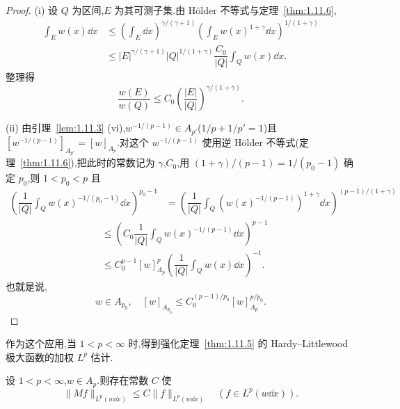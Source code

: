 \begin{proof}
(i) 设 $Q$ 为区间,$E$ 为其可测子集.由 Hölder 不等式与定理~\ref{thm:1.11.6},
\begin{align*}
\displaystyle\int_{E}w(x)\dd x &\leq \left(\int_{E}\dd x\right)^{\gamma/(\gamma+1)}\left(\int_{E}w(x)^{1+\gamma}\dd x\right)^{1/(1+\gamma)} \\
&\leq |E|^{\gamma/(\gamma+1)}|Q|^{1/(1+\gamma)}\dfrac{C_{0}}{|Q|}\int_{Q}w(x)\dd x.
\end{align*}
整理得
\begin{equation*}
\frac{w(E)}{w(Q)} \leq C_{0}\left(\frac{|E|}{|Q|}\right)^{\gamma/(1+\gamma)}.
\end{equation*}

(ii) 由引理~\ref{lem:1.11.3} (vi),$w^{-1/(p-1)} \in A_{p'}$($1/p + 1/p' = 1$)且 $[w^{-1/(p-1)}]_{A_{p'}} = [w]_{A_{p}}$.对这个 $w^{-1/(p-1)}$ 使用逆 Hölder 不等式(定理~\ref{thm:1.11.6}),把此时的常数记为 $\gamma$,$C_{0}$,用 $(1 + \gamma)/(p - 1) = 1/(p_{0} - 1)$ 确定 $p_{0}$,则 $1 < p_{0} < p$ 且
\begin{equation*}
\begin{aligned}
\left(\dfrac{1}{|Q|}\displaystyle\int_{Q}w(x)^{-1/(p_{0}-1)}\dd x\right)^{p_{0}-1}&= \left(\dfrac{1}{|Q|}\displaystyle\int_{Q}\left(w(x)^{-1/(p-1)}\right)^{1+\gamma}\dd x\right)^{(p-1)/(1+\gamma)}
 \end{aligned}
\end{equation*}
\begin{align*}
&\leq \left(C_{0}\dfrac{1}{|Q|}\displaystyle\int_{Q}w(x)^{-1/(p-1)}\dd x\right)^{p-1} \\
&\leq C_{0}^{p-1}[w]_{A_{p}}^{p}\left(\dfrac{1}{|Q|}\displaystyle\int_{Q}w(x)\dd x\right)^{-1}.
\end{align*}
也就是说,
\begin{equation*}
w \in A_{p_{0}}, \quad [w]_{A_{p_{0}}} \leq C_{0}^{(p-1)/p_{0}}[w]_{A_{p}}^{p/p_{0}}.
\end{equation*}
\end{proof}

作为这个应用,当 $1 < p < \infty$ 时,得到强化定理~\ref{thm:1.11.5} 的 Hardy--Littlewood 极大函数的加权 $L^{p}$ 估计.

\begin{lemma}\label{lem:1.11.8}
设 $1 < p < \infty$,$w \in A_{p}$.则存在常数 $C$ 使
\begin{equation*}
\| Mf \|_{L^{p}(w\dd x)} \leq C\| f \|_{L^{p}(w\dd x)} \quad (f \in L^{p}(w\dd x)).
\end{equation*}
\end{lemma}

